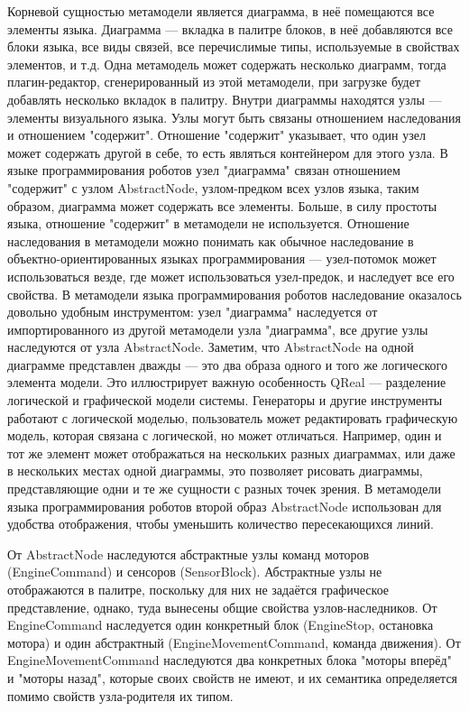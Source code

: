 \documentclass[a4paper]{article}
\begin{document}
Корневой сущностью метамодели является диаграмма, в неё помещаются все элементы языка. Диаграмма --- вкладка в палитре блоков, в неё добавляются все блоки языка, все виды связей, все перечислимые типы, используемые в свойствах элементов, и т.д. Одна метамодель может содержать несколько диаграмм, тогда плагин-редактор, сгенерированный из этой метамодели, при загрузке будет добавлять несколько вкладок в палитру. Внутри диаграммы находятся узлы --- элементы визуального языка. Узлы могут быть связаны отношением наследования и отношением "содержит". Отношение "содержит" указывает, что один узел может содержать другой в себе, то есть являться контейнером для этого узла. В языке программирования роботов узел "диаграмма" связан отношением "содержит" с узлом AbstractNode, узлом-предком всех узлов языка, таким образом, диаграмма может содержать все элементы. Больше, в силу простоты языка, отношение "содержит" в метамодели не используется. Отношение наследования в метамодели можно понимать как обычное наследование в объектно-ориентированных языках программирования --- узел-потомок может использоваться везде, где может использоваться узел-предок, и наследует все его свойства. В метамодели языка программирования роботов наследование оказалось довольно удобным инструментом: узел "диаграмма" наследуется от импортированного из другой метамодели узла "диаграмма", все другие узлы наследуются от узла AbstractNode. Заметим, что AbstractNode на одной диаграмме представлен дважды --- это два образа одного и того же логического элемента модели. Это иллюстрирует важную особенность QReal --- разделение логической и графической модели системы. Генераторы и другие инструменты работают с логической моделью, пользователь может редактировать графическую модель, которая связана с логической, но может отличаться. Например, один и тот же элемент может отображаться на нескольких разных диаграммах, или даже в нескольких местах одной диаграммы, это позволяет рисовать диаграммы, представляющие одни и те же сущности с разных точек зрения. В метамодели языка программирования роботов второй образ AbstractNode использован для удобства отображения, чтобы уменьшить количество пересекающихся линий.

От AbstractNode наследуются абстрактные узлы команд моторов (EngineCommand) и сенсоров (SensorBlock). Абстрактные узлы не отображаются в палитре, поскольку для них не задаётся графическое представление, однако, туда вынесены общие свойства узлов-наследников. От EngineCommand наследуется один конкретный блок (EngineStop, остановка мотора) и один абстрактный (EngineMovementCommand, команда движения). От EngineMovementCommand наследуются два конкретных блока "моторы вперёд" и "моторы назад", которые своих свойств не имеют, и их семантика определяется помимо свойств узла-родителя их типом. 
\end{document}
